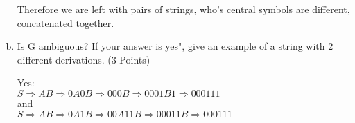 \documentclass{article}
\begin{document}
\begin{enumerate}[(a)]
Therefore we are left with pairs of strings, who's central symbols are different, concatenated
together.

\item Is G ambiguous? If your answer is yes", give an example of a string with 2
different derivations. (3 Points)

Yes: \\
$S \Rightarrow AB \Rightarrow 0A0B \Rightarrow 000B \Rightarrow
0001B1 \Rightarrow 000111$ \\
and \\
$S \Rightarrow AB \Rightarrow 0A1B \Rightarrow 00A11B \Rightarrow
00011B \Rightarrow 000111$
\end{enumerate}
\end{document}
